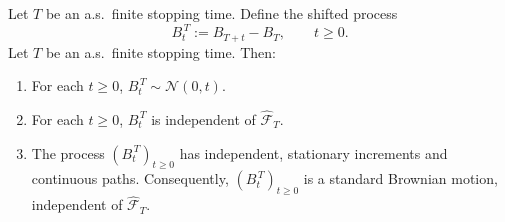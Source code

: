 \begin{theorem}
Let $T$ be an a.s.\ finite stopping time. Define the shifted process
\[
B_t^{\,T}:=B_{T+t}-B_T,\qquad t\ge0.
\] Let $T$ be an a.s.\ finite stopping time. Then:
\begin{enumerate}
\item For each $t\ge0$, $B_t^{\,T}\sim\mathcal N(0,t)$.
\item For each $t\ge0$, $B_t^{\,T}$ is independent of $\widehat{\mathcal F}_T$.
\item The process $(B_t^{\,T})_{t\ge0}$ has independent, stationary increments and continuous paths.
Consequently, $(B_t^{\,T})_{t\ge0}$ is a standard Brownian motion, independent of $\widehat{\mathcal F}_T$.
\end{enumerate}
\end{theorem}

